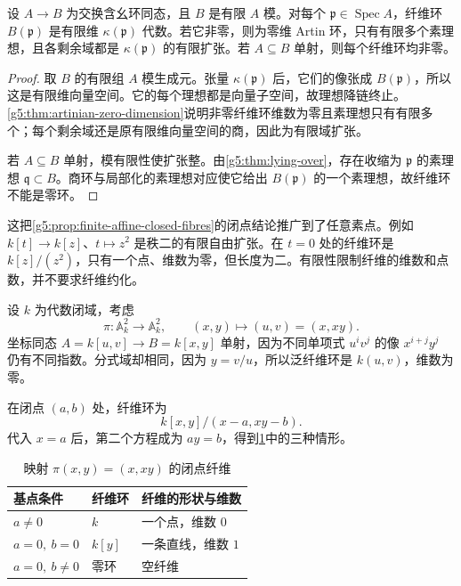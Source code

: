 \begin{proposition}
\label{g5:prop:finite-fiber-algebra}
	设 \(A\rightarrow B\) 为交换含幺环同态，且 \(B\) 是有限 \(A\) 模。对每个 \(\mathfrak p\in\operatorname{Spec}A\)，纤维环 \(B(\mathfrak p)\) 是有限维 \(\kappa(\mathfrak p)\) 代数。若它非零，则为零维 Artin 环，只有有限多个素理想，且各剩余域都是 \(\kappa(\mathfrak p)\) 的有限扩张。若 \(A\subseteq B\) 单射，则每个纤维环均非零。
\end{proposition}
\begin{proof}
	取 \(B\) 的有限组 \(A\) 模生成元。张量 \(\kappa(\mathfrak p)\) 后，它们的像张成 \(B(\mathfrak p)\)，所以这是有限维向量空间。它的每个理想都是向量子空间，故理想降链终止。\cref{g5:thm:artinian-zero-dimension}说明非零纤维环维数为零且素理想只有有限多个；每个剩余域还是原有限维向量空间的商，因此为有限域扩张。

	若 \(A\subseteq B\) 单射，模有限性使扩张整。由\cref{g5:thm:lying-over}，存在收缩为 \(\mathfrak p\) 的素理想 \(\mathfrak q\subset B\)。商环与局部化的素理想对应使它给出 \(B(\mathfrak p)\) 的一个素理想，故纤维环不能是零环。
\end{proof}

这把\cref{g5:prop:finite-affine-closed-fibres}的闭点结论推广到了任意素点。例如 \(k[t]\rightarrow k[z]\)、\(t\mapsto z^2\) 是秩二的有限自由扩张。在 \(t=0\) 处的纤维环是 \(k[z]/(z^2)\)，只有一个点、维数为零，但长度为二。有限性限制纤维的维数和点数，并不要求纤维约化。

\begin{example}
\label{g5:exm:fiber-dimension-jump}
	设 \(k\) 为代数闭域，考虑
	\[
		\pi:\mathbb A_k^2\longrightarrow\mathbb A_k^2,\qquad
		(x,y)\longmapsto(u,v)=(x,xy).
	\]
	坐标同态 \(A=k[u,v]\rightarrow B=k[x,y]\) 单射，因为不同单项式 \(u^iv^j\) 的像 \(x^{i+j}y^j\) 仍有不同指数。分式域却相同，因为 \(y=v/u\)，所以泛纤维环是 \(k(u,v)\)，维数为零。

	在闭点 \((a,b)\) 处，纤维环为
	\[
		k[x,y]/(x-a,xy-b).
	\]
	代入 \(x=a\) 后，第二个方程成为 \(ay=b\)，得到\cref{g5:tab:fiber-dimension-jump}中的三种情形。
\end{example}

\begin{table}[htbp]
	\centering
	\caption{映射 \(\pi(x,y)=(x,xy)\) 的闭点纤维}
	\label{g5:tab:fiber-dimension-jump}
	\begin{tabular}{lll}
		\toprule
		基点条件 & 纤维环 & 纤维的形状与维数 \\
		\midrule
		\(a\ne0\) & \(k\) & 一个点，维数 \(0\) \\
		\(a=0,\ b=0\) & \(k[y]\) & 一条直线，维数 \(1\) \\
		\(a=0,\ b\ne0\) & 零环 & 空纤维 \\
		\bottomrule
	\end{tabular}
\end{table}

